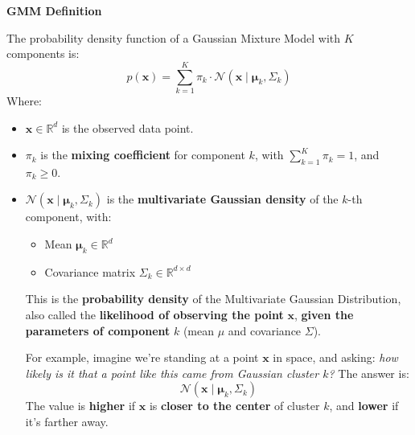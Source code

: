 \highspace
\begin{flushleft}
    \textcolor{Green3}{ \textbf{GMM Definition}}
\end{flushleft}
The probability density function of a Gaussian Mixture Model with $K$ components is:
\begin{equation}
    p\left(\mathbf{x}\right) = \sum_{k=1}^{K} \pi_{k} \cdot \mathcal{N}\left(\mathbf{x} \mid \boldsymbol{\mu}_{k}, \Sigma_{k}\right)
\end{equation}
Where:
\begin{itemize}
    \item $\mathbf{x} \in \mathbb{R}^{d}$ is the observed data point.
    \item $\pi_{k}$ is the \textbf{mixing coefficient} for component $k$, with $\displaystyle\sum_{k=1}^{K} \pi_{k} = 1$, and $\pi_{k} \geq 0$.
    \item $\mathcal{N}(\mathbf{x} \mid \boldsymbol{\mu}_{k}, \Sigma_{k})$ is the \textbf{multivariate Gaussian density} of the $k$-th component, with:
    \begin{itemize}
        \item Mean $\boldsymbol{\mu}_{k} \in \mathbb{R}^{d}$
        \item Covariance matrix $\Sigma_{k} \in \mathbb{R}^{d \times d}$
    \end{itemize}
    This is the \textbf{probability density} of the Multivariate Gaussian Distribution, also called the \textbf{likelihood of observing the point} $\mathbf{x}$, \textbf{given the parameters of component} $k$ (mean $\mu$ and covariance $\Sigma$).

    For example, imagine we're standing at a point $\mathbf{x}$ in space, and asking: \emph{how likely is it that a point like this came from Gaussian cluster $k$?} The answer is:
    \begin{equation*}
        \mathcal{N}(\mathbf{x} \mid \boldsymbol{\mu}_k, \Sigma_k)
    \end{equation*}
    The value is \textbf{higher} if $\mathbf{x}$ is \textbf{closer to the center} of cluster $k$, and \textbf{lower} if it's farther away.
\end{itemize}

\newpage


